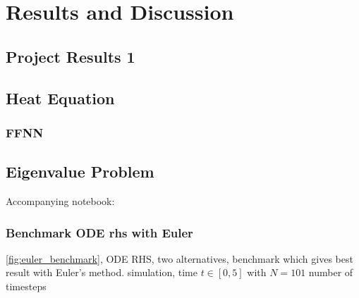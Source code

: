 \section{Results and Discussion}\label{sec:Results}

\subsection{Project Results 1}\label{sec:project results}

\subsection{Heat Equation}\label{sec:heateq results}



\subsubsection{FFNN}


\subsection{Eigenvalue Problem}\label{sec:eigenvalue results}

Accompanying notebook: 


\subsubsection*{Benchmark ODE rhs with Euler}

\autoref{fig:euler_benchmark}, ODE RHS, two alternatives, benchmark which gives best result with Euler's method. simulation, time $t\in [0, 5]$ with $N = 101$ number of timesteps

